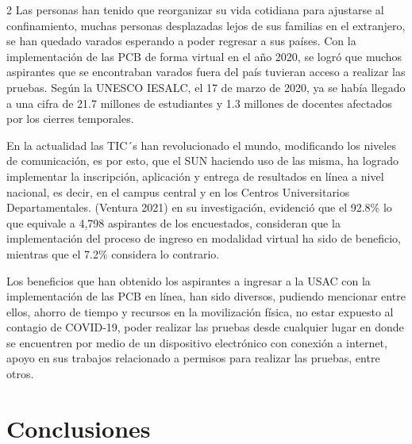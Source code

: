 \documentclass[12pt,spanish,Letterpaper,openany]{book}
\begin{document}
\begin {multicols}{2}
Las personas han tenido que reorganizar su vida cotidiana para ajustarse al confinamiento, muchas personas desplazadas lejos de sus familias en el extranjero, se han quedado varados esperando a poder regresar a sus países. Con la implementación de las PCB de forma virtual en el año 2020, se logró que muchos aspirantes que se encontraban varados fuera del país tuvieran acceso a realizar las pruebas. Según la UNESCO IESALC, el 17 de marzo de 2020, ya se había llegado a una cifra de 21.7 millones de estudiantes y 1.3 millones de docentes afectados por los cierres temporales.

En la actualidad las TIC´s han revolucionado el mundo, modificando los niveles de comunicación, es por esto, que el SUN haciendo uso de las misma, ha logrado implementar la inscripción, aplicación y entrega de resultados en línea a nivel nacional, es decir, en el campus central y en los Centros Universitarios Departamentales. (Ventura 2021) en su investigación, evidenció que el 92.8\% lo que equivale a 4,798 aspirantes de los encuestados, consideran que la implementación del proceso de ingreso en modalidad virtual ha sido de beneficio, mientras que el 7.2\% considera lo contrario.

Los beneficios que han obtenido los aspirantes a ingresar a la USAC con la implementación de las PCB en línea, han sido diversos, pudiendo mencionar entre ellos, ahorro de tiempo y recursos en la movilización física, no estar expuesto al contagio de COVID-19, poder realizar las pruebas desde cualquier lugar en donde se encuentren por medio de un dispositivo electrónico con conexión a internet, apoyo en sus trabajos relacionado a permisos para realizar las pruebas, entre otros.

\hypertarget{conclusiones-5}{%
\section{Conclusiones}\label{conclusiones-5}}


\end{multicols}
\end{document}
